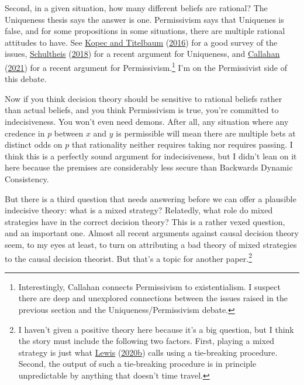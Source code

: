 \documentclass[
  12pt,
]{article}
\begin{document}
Second, in a given situation, how many different beliefs are rational?
The Uniqueness thesis says the answer is one. Permissivism says that
Uniquenes is false, and for some propositions in some situations, there
are multiple rational attitudes to have. See
\protect\hyperlink{ref-KopecTitelbaum2016}{Kopec and Titelbaum}
(\protect\hyperlink{ref-KopecTitelbaum2016}{2016}) for a good survey of
the issues, \protect\hyperlink{ref-Schultheis2018}{Schultheis}
(\protect\hyperlink{ref-Schultheis2018}{2018}) for a recent argument for
Uniqueness, and \protect\hyperlink{ref-Callahan2021}{Callahan}
(\protect\hyperlink{ref-Callahan2021}{2021}) for a recent argument for
Permissivism.\footnote{Interestingly, Callahan connects Permissivism to
  existentialism. I suspect there are deep and unexplored connections
  between the issues raised in the previous section and the
  Uniqueness/Permissivism debate.} I'm on the Permissivist side of this
debate.

Now if you think decision theory should be sensitive to rational beliefs
rather than actual beliefs, and you think Permissivism is true, you're
committed to indecisiveness. You won't even need demons. After all, any
situation where any credence in \(p\) between \(x\) and \(y\) is
permissible will mean there are multiple bets at distinct odds on \(p\)
that rationality neither requires taking nor requires passing. I think
this is a perfectly sound argument for indecisiveness, but I didn't lean
on it here because the premises are considerably less secure than
Backwards Dynamic Consistency.

But there is a third question that needs answering before we can offer a
plausible indecisive theory: what is a mixed strategy? Relatedly, what
role do mixed strategies have in the correct decision theory? This is a
rather vexed question, and an important one. Almost all recent arguments
against causal decision theory seem, to my eyes at least, to turn on
attributing a bad theory of mixed strategies to the causal decision
theorist. But that's a topic for another paper.\footnote{I haven't given
  a positive theory here because it's a big question, but I think the
  story must include the following two factors. First, playing a mixed
  strategy is just what
  \protect\hyperlink{ref-Lewis-Kavka-10071979}{Lewis}
  (\protect\hyperlink{ref-Lewis-Kavka-10071979}{2020b}) calls using a
  tie-breaking procedure. Second, the output of such a tie-breaking
  procedure is in principle unpredictable by anything that doesn't time
  travel.}
\end{document}
